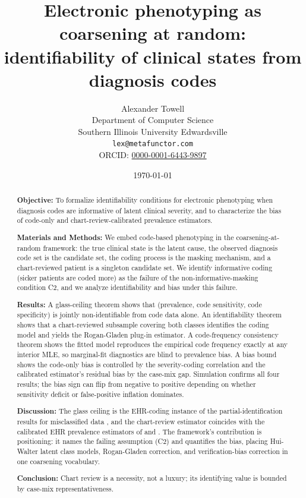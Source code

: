 \documentclass[11pt,letterpaper]{article}
\title{Electronic phenotyping as coarsening at random:\\
       identifiability of clinical states from diagnosis codes}
\author{
  Alexander Towell \\
  Department of Computer Science \\
  Southern Illinois University Edwardsville \\
  \texttt{lex@metafunctor.com} \\
  ORCID: \href{https://orcid.org/0000-0001-6443-9897}{0000-0001-6443-9897}
}
\date{\today}
\theoremstyle{plain}
\theoremstyle{definition}
\theoremstyle{remark}
\newcommand{\1}{\mathbf{1}}
\begin{document}
\maketitle

\begin{abstract}
\noindent\textbf{Objective:} To formalize identifiability conditions
for electronic phenotyping when diagnosis codes are informative of
latent clinical severity, and to characterize the bias of code-only
and chart-review-calibrated prevalence estimators.

\noindent\textbf{Materials and Methods:} We embed code-based
phenotyping in the coarsening-at-random framework: the true clinical
state is the latent cause, the observed diagnosis code set is the
candidate set, the coding process is the masking mechanism, and a
chart-reviewed patient is a singleton candidate set. We identify
informative coding (sicker patients are coded more) as the failure of
the non-informative-masking condition C2, and we analyze identifiability
and bias under this failure.

\noindent\textbf{Results:} A glass-ceiling theorem shows that
(prevalence, code sensitivity, code specificity) is jointly
non-identifiable from code data alone. An identifiability theorem
shows that a chart-reviewed subsample covering both classes identifies
the coding model and yields the Rogan-Gladen plug-in estimator. A
code-frequency consistency theorem shows the fitted model reproduces
the empirical code frequency exactly at any interior MLE, so
marginal-fit diagnostics are blind to prevalence bias. A bias bound
shows the code-only bias is controlled by the severity-coding
correlation and the calibrated estimator's residual bias by the
case-mix gap. Simulation confirms all four results; the bias sign can
flip from negative to positive depending on whether sensitivity
deficit or false-positive inflation dominates.

\noindent\textbf{Discussion:} The glass ceiling is the EHR-coding
instance of the partial-identification results for misclassified data
\citep{horowitz1995identification,molinari2008partial}, and the
chart-review estimator coincides with the calibrated EHR prevalence
estimators of \citet{tong2020augmented} and
\citet{beesley2022samba}. The framework's contribution is positioning:
it names the failing assumption (C2) and quantifies the bias, placing
Hui-Walter latent class models, Rogan-Gladen correction, and
verification-bias correction in one coarsening vocabulary.

\noindent\textbf{Conclusion:} Chart review is a necessity, not a
luxury; its identifying value is bounded by case-mix representativeness.
\end{abstract}












\end{document}
